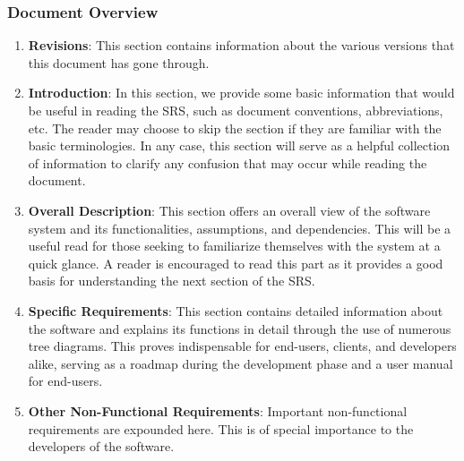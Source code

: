 \documentclass[11pt]{article}
\begin{document}
\subsubsection{Document Overview}
\begin{enumerate}
    \item \textbf{Revisions}: This section contains information about the various versions that this document has gone through.
    \item \textbf{Introduction}: In this section, we provide some basic information that would be useful in reading the SRS, such as document conventions, abbreviations, etc. The reader may choose to skip the section if they are familiar with the basic terminologies. In any case, this section will serve as a helpful collection of information to clarify any confusion that may occur while reading the document.
    \item \textbf{Overall Description}: This section offers an overall view of the software system and its functionalities, assumptions, and dependencies. This will be a useful read for those seeking to familiarize themselves with the system at a quick glance. A reader is encouraged to read this part as it provides a good basis for understanding the next section of the SRS.
    \item \textbf{Specific Requirements}: This section contains detailed information about the software and explains its functions in detail through the use of numerous tree diagrams. This proves indispensable for end-users, clients, and developers alike, serving as a roadmap during the development phase and a user manual for end-users.
    \item \textbf{Other Non-Functional Requirements}: Important non-functional requirements are expounded here. This is of special importance to the developers of the software.
\end{enumerate}
\end{document}
